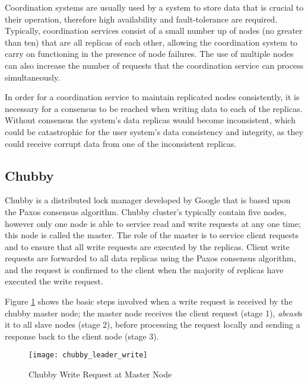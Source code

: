 Coordination systems are usually used by a system to store data that is crucial to their operation, therefore high availability and fault-tolerance are required. Typically, coordination services consist of a small number up of nodes (no greater than ten) that are all replicas of each other, allowing the coordination system to carry on functioning in the presence of node failures. The use of multiple nodes can also increase the number of requests that the coordination service can process simultaneously. 

In order for a coordination service to maintain replicated nodes consistently, it is necessary for a consensus to be reached when writing data to each of the replicas. Without consensus the system's data replicas would become inconsistent, which could be catastrophic for the user system's data consistency and integrity, as they could receive corrupt data from one of the inconsistent replicas. 

	\subsection{Chubby}
	Chubby\citep{Burrows:2006:CLS:1298455.1298487} is a distributed lock manager developed by Google that is based upon the Paxos\citep{Lamport:1998:PP:279227.279229}\citep{Lamport:2001:PaxosMadeSimple} consensus algorithm. Chubby cluster's typically contain five nodes, however only one node is able to service read and write requests at any one time; this node is called the master. The role of the master is to service client requests and to ensure that all write requests are executed by the replicas. Client write requests are forwarded to all data replicas using the Paxos consensus algorithm, and the request is confirmed to the client when the majority of replicas have executed the write request. 

Figure \ref{fig:chubby_leader_write} shows the basic steps involved when a write request is received by the chubby master node; the master node receives the client request (stage 1), \emph{abcast}s it to all slave nodes (stage 2), before processing the request locally and sending a response back to the client node (stage 3).  

	\begin{figure}[htbp!] 
	    \centering    
	    \texttt{[image: chubby\_leader\_write]}
	    \caption[Chubby Write Request at Master Node]{Chubby Write Request at Master Node}
	    \label{fig:chubby_leader_write}
	\end{figure}	 

